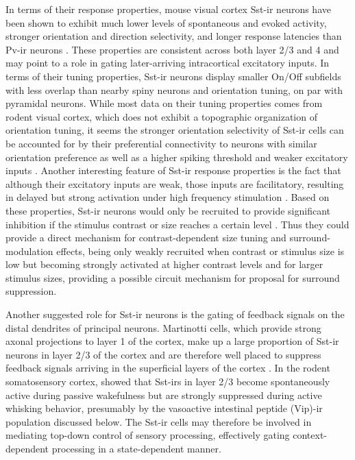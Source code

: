In terms of their response properties, mouse visual cortex Sst-ir
neurons have been shown to exhibit much lower levels of spontaneous
and evoked activity, stronger orientation and direction selectivity,
and longer response latencies than Pv-ir neurons \citep{Ma2011}. These
properties are consistent across both layer 2/3 and 4 and may point to
a role in gating later-arriving intracortical excitatory inputs. In
terms of their tuning properties, Sst-ir neurons display smaller
On/Off subfields with less overlap than nearby spiny neurons and
orientation tuning, on par with pyramidal neurons. While most data on
their tuning properties comes from rodent visual cortex, which does
not exhibit a topographic organization of orientation tuning, it seems
the stronger orientation selectivity of Sst-ir cells can be accounted
for by their preferential connectivity to neurons with similar
orientation preference as well as a higher spiking threshold and
weaker excitatory inputs \citep{Bartley2008}. Another interesting
feature of Sst-ir response properties is the fact that although their
excitatory inputs are weak, those inputs are facilitatory, resulting
in delayed but strong activation under high frequency stimulation
\citep{Beierlein2003,Bartley2008,Tan2008}. Based on these properties,
Sst-ir neurons would only be recruited to provide significant
inhibition if the stimulus contrast or size reaches a certain level
\citep{Adesnik2012}. Thus they could provide a direct mechanism for
contrast-dependent size tuning and surround-modulation effects, being
only weakly recruited when contrast or stimulus size is low but
becoming strongly activated at higher contrast levels and for larger
stimulus sizes, providing a possible circuit mechanism for
\cite{Sillito1979} proposal for surround suppression.

Another suggested role for Sst-ir neurons is the gating of feedback
signals on the distal dendrites of principal neurons. Martinotti
cells, which provide strong axonal projections to layer 1 of the
cortex, make up a large proportion of Sst-ir neurons in layer 2/3 of
the cortex and are therefore well placed to suppress feedback signals
arriving in the superficial layers of the cortex
\citep{Fanselow2008,Gentet2012}. In the rodent somatosensory cortex,
\cite{Gentet2012} showed that Sst-irs in layer 2/3 become
spontaneously active during passive wakefulness but are strongly
suppressed during active whisking behavior, presumably by the
vasoactive intestinal peptide (Vip)-ir population discussed below. The
Sst-ir cells may therefore be involved in mediating top-down control
of sensory processing, effectively gating context-dependent processing
in a state-dependent manner.

